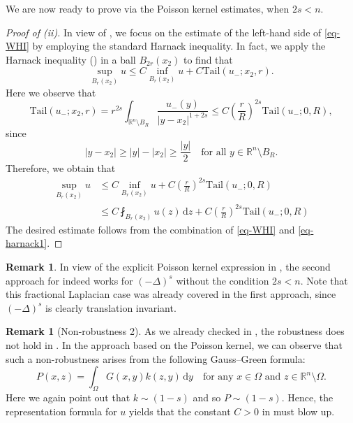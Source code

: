 \documentclass[11pt]{amsart}
\theoremstyle{plain}
\theoremstyle{definition}
\newtheorem{remark}[theorem]{Remark}
\numberwithin{equation}{section}
\begin{document}
We are now ready to prove  via the Poisson kernel estimates, when $2s<n$. 
\begin{proof}[Proof of  (ii)]
   In view of , we focus on the estimate of the left-hand side of \eqref{eq-WHI} by employing the standard Harnack inequality. In fact, we apply the Harnack inequality () in a ball $B_{2r}(x_2)$ to find that
    \begin{equation*}
        \sup_{B_r(x_2)}u \leq C\inf_{B_r(x_2)}u+C\mathrm{Tail}(u_-; x_2, r).
    \end{equation*}
    Here we observe that
    \begin{equation*}
        \mathrm{Tail}(u_-; x_2, r)=r^{2s}\int_{\mathbb{R}^n \setminus B_R} \frac{u_-(y)}{|y-x_2|^{1+2s}} \leq C\left(\frac{r}{R}\right)^{2s}\mathrm{Tail}(u_-; 0, R),
    \end{equation*}
    since
    \begin{equation*}
        |y-x_2| \geq |y|-|x_2| \geq \frac{|y|}{2}  \quad \text{for all $y \in \mathbb{R}^n \setminus B_R$}.
    \end{equation*}
    Therefore, we obtain that
    \begin{equation}\label{eq-harnack1}
        \begin{aligned}
             \sup_{B_r(x_2)}u &\leq C\inf_{B_r(x_2)}u+C\left(\frac{r}{R}\right)^{2s}\mathrm{Tail}(u_-; 0, R)\\
             &\leq C\fint_{B_r(x_2)}u(z)\,\mathrm{d}z+C\left(\frac{r}{R}\right)^{2s}\mathrm{Tail}(u_-; 0, R)
        \end{aligned}
    \end{equation}
    The desired estimate follows from the combination of \eqref{eq-WHI} and \eqref{eq-harnack1}.
\end{proof}

\begin{remark}
    In view of the explicit Poisson kernel expression in , the second approach for  indeed works for $(-\Delta)^s$ without the condition $2s<n$. Note that this fractional Laplacian case was already covered in the first approach, since $(-\Delta)^s$ is clearly translation invariant.    
\end{remark}

\begin{remark}[Non-robustness 2]\label{rmk-robust2}
    As we already checked in , the robustness does not hold in . In the approach based on the Poisson kernel, we can observe that such a non-robustness arises from the following Gauss--Green formula:
    \begin{equation*}
        P(x, z)=\int_{\Omega}G(x, y)k(z, y)\,\mathrm{d}y \quad \text{for any $x \in \Omega$ and $z \in \mathbb{R}^n \setminus \Omega$}.
    \end{equation*}
    Here we again point out that $k \sim (1-s)$ and so $P \sim (1-s)$. Hence, the representation formula for $u$ yields that the constant $C>0$ in  must blow up.
\end{remark}
\end{document}
